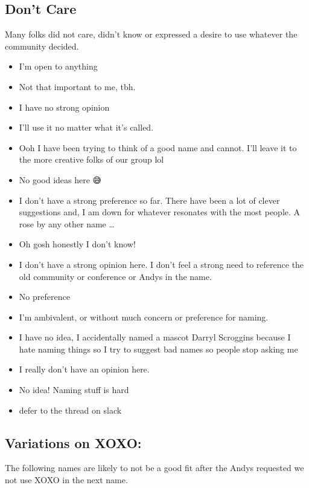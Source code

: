 \documentclass[
]{book}
\providecommand{\tightlist}{%
  \setlength{\itemsep}{0pt}\setlength{\parskip}{0pt}}
\begin{document}
\subsection{Don't Care}\label{dont-care}

Many folks did not care, didn't know or expressed a desire to use whatever the community decided.

\begin{itemize}
\tightlist
\item
  I'm open to anything
\item
  Not that important to me, tbh.
\item
  I have no strong opinion
\item
  I'll use it no matter what it's called.
\item
  Ooh I have been trying to think of a good name and cannot. I'll leave it to the more creative folks of our group lol
\item
  No good ideas here 😅
\item
  I don't have a strong preference so far. There have been a lot of clever suggestions and, I am down for whatever resonates with the most people. A rose by any other name \ldots{}
\item
  Oh gosh honestly I don't know!
\item
  I don't have a strong opinion here. I don't feel a strong need to reference the old community or conference or Andys in the name.
\item
  No preference
\item
  I'm ambivalent, or without much concern or preference for naming.
\item
  I have no idea, I accidentally named a mascot Darryl Scroggins because I hate naming things so I try to suggest bad names so people stop asking me
\item
  I really don't have an opinion here.
\item
  No idea! Naming stuff is hard
\item
  defer to the thread on slack
\end{itemize}

\subsection{Variations on XOXO:}\label{variations-on-xoxo}

The following names are likely to not be a good fit after the Andys requested we not use XOXO in the next name.
\end{document}
